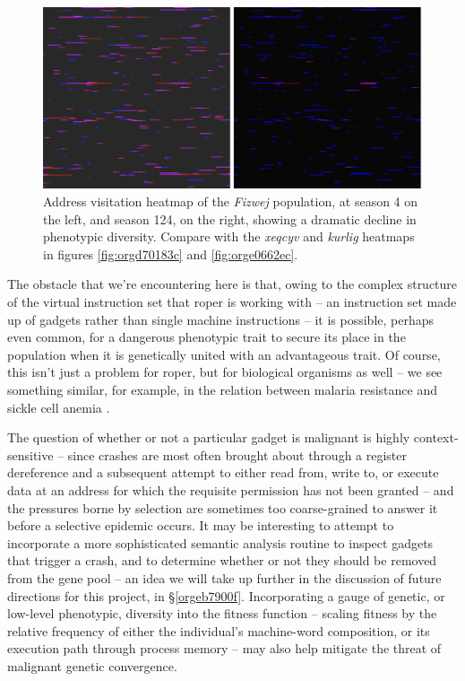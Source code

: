 \documentclass[12pt,glossary]{dalthesis}
\begin{document}
\begin{figure}[htbp]
\centering
\includegraphics[width=.9\linewidth]{../images/plots/fizwej_S124_heatmap.pdf}
\caption{\label{fig:org547fc22}
Address visitation heatmap of the \emph{Fizwej} population, at season 4 on the left, and season 124, on the right, showing a dramatic decline in phenotypic diversity. Compare with the \emph{xeqcyv} and \emph{kurlig} heatmaps in figures \ref{fig:orgd70183c} and \ref{fig:orge0662ec}.}
\end{figure}

The obstacle that we're encountering here is that, owing to the complex structure
of the virtual instruction set that \gls{roper} is working with -- an instruction set
made up of gadgets rather than single machine instructions -- it is possible, perhaps
even common, for a dangerous phenotypic trait to secure its place in the population
when it is genetically united with an advantageous trait. Of course, this isn't just
a problem for \gls{roper}, but for biological organisms as well -- we see something
similar, for example, in the relation between malaria resistance and sickle cell
anemia \cite{haldane49}.

The question of whether or not a particular gadget is malignant is highly
context-sensitive -- since crashes are most often brought about through a
register dereference and a subsequent attempt to either read from, write to, or
execute data at an address for which the requisite permission has not been
granted -- and the pressures borne by selection are sometimes too coarse-grained
to answer it before a selective epidemic occurs. It may be interesting to
attempt to incorporate a more sophisticated semantic analysis routine to inspect
gadgets that trigger a crash, and to determine whether or not they should be
removed from the gene pool -- an idea we will take up further in the discussion
of future directions for this project, in \S \ref{orgeb7900f}. Incorporating
a gauge of genetic, or low-level phenotypic, diversity into the fitness function
-- scaling fitness by the relative frequency of either the individual's
machine-word composition, or its execution path through process memory -- may
also help mitigate the threat of malignant genetic convergence.
\end{document}
